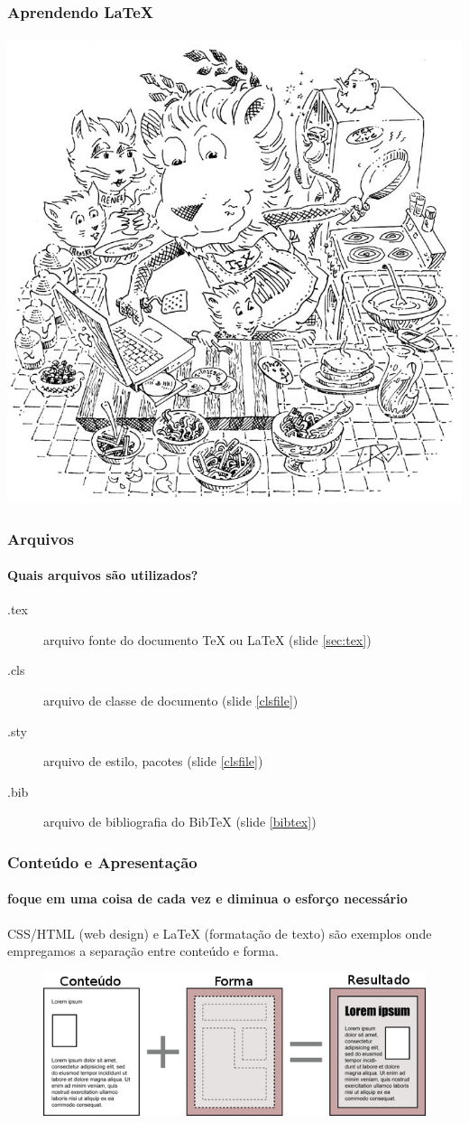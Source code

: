\begin{frame}
\frametitle{Aprendendo \LaTeX{}}
\framesubtitle{}
\centering
\includegraphics[width=0.7\linewidth]{figures/lion02.png}
\end{frame}



\begin{frame}
\frametitle{Arquivos}
\framesubtitle{Quais arquivos são utilizados?}
\begin{description}
\item[.tex] arquivo fonte do documento \TeX{} ou \LaTeX{} (slide \ref{sec:tex})
\item[.cls] arquivo de classe de documento (slide \ref{clsfile})
\item[.sty] arquivo de estilo, pacotes (slide \ref{clsfile})
\item[.bib] arquivo de bibliografia do BibTeX (slide \ref{bibtex})
\end{description}
\end{frame}

\begin{frame}
\frametitle{Conteúdo e Apresentação}
\framesubtitle{foque em uma coisa de cada vez e diminua o esforço necessário}
  CSS/HTML (web design) e \LaTeX{} (formatação de texto) são exemplos onde empregamos a separação entre conteúdo e forma.
  \begin{figure}[h!]
  \centering
  \includegraphics[width=\textwidth]{figures/content_design.png}
  \label{fig:content_design}
  \end{figure}
\end{frame}



